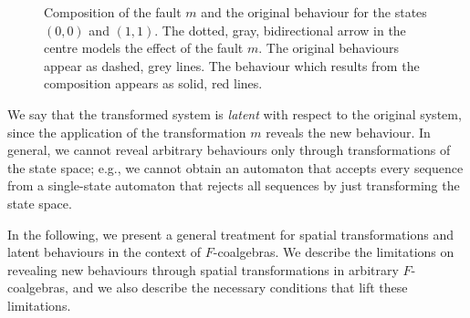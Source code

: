 \begin{figure}[t]
    \centering
    \caption{Composition of the fault $m$ and the original behaviour for the states $(0,0)$ and $(1,1)$. The dotted, gray, bidirectional arrow in the centre models the effect of the fault $m$. The original behaviours appear as dashed, grey lines. The behaviour which results from the composition appears as solid, red lines.}
    \label{fig:ExampleWithFaults}
\end{figure}
We say that the transformed system is \emph{latent} with respect to the original system, since the application of the transformation $m$ reveals the new behaviour. In general, we cannot reveal arbitrary behaviours only through transformations of the state space; e.g., we cannot obtain an automaton that accepts every sequence from a single-state automaton that rejects all sequences by just transforming the state space. 

In the following, we present a general treatment for spatial transformations and latent behaviours in the context of $F$-coalgebras. We describe the limitations on revealing new behaviours through  spatial transformations in arbitrary $F$-coalgebras, and we also describe the necessary conditions that lift these limitations.

